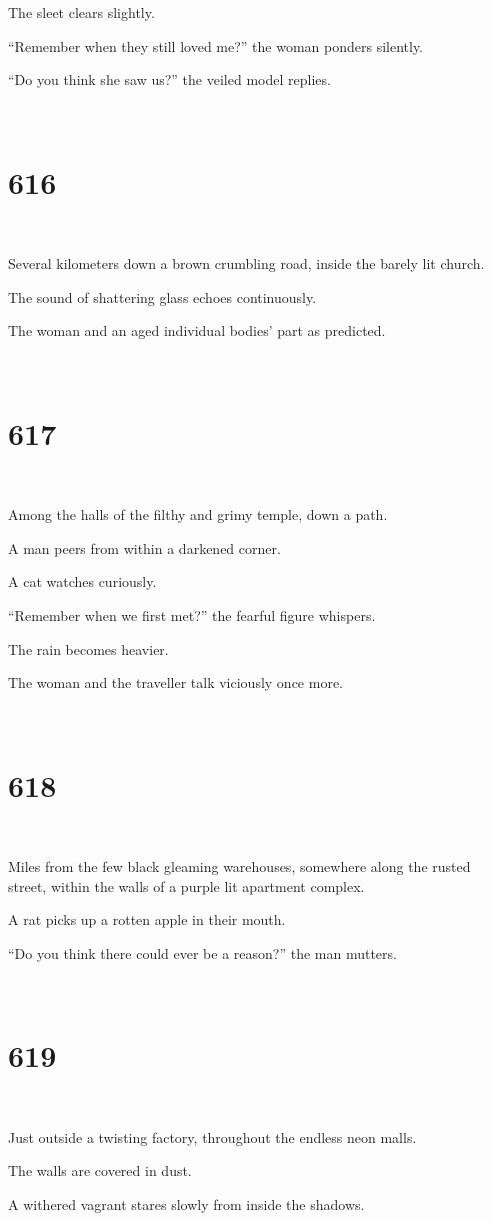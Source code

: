 \documentclass{report}
\begin{document}
The sleet clears slightly.

``Remember when they still loved me?'' the woman ponders silently.

``Do you think she saw us?'' the veiled model replies.

~
\chapter*{616}
~

Several kilometers down a brown crumbling road, inside the barely lit church.

The sound of shattering glass echoes continuously.

The woman and an aged individual bodies' part as predicted.

~
\chapter*{617}
~

Among the halls of the filthy and grimy temple, down a path.

A man peers from within a darkened corner.

A cat watches curiously.

``Remember when we first met?'' the fearful figure whispers.

The rain becomes heavier.

The woman and the traveller talk viciously once more.

~
\chapter*{618}
~

Miles from the few black gleaming warehouses, somewhere along the rusted street, within the walls of a purple lit apartment complex.

A rat picks up a rotten apple in their mouth.

``Do you think there could ever be a reason?'' the man mutters.

~
\chapter*{619}
~

Just outside a twisting factory, throughout the endless neon malls.

The walls are covered in dust.

A withered vagrant stares slowly from inside the shadows.
\end{document}
